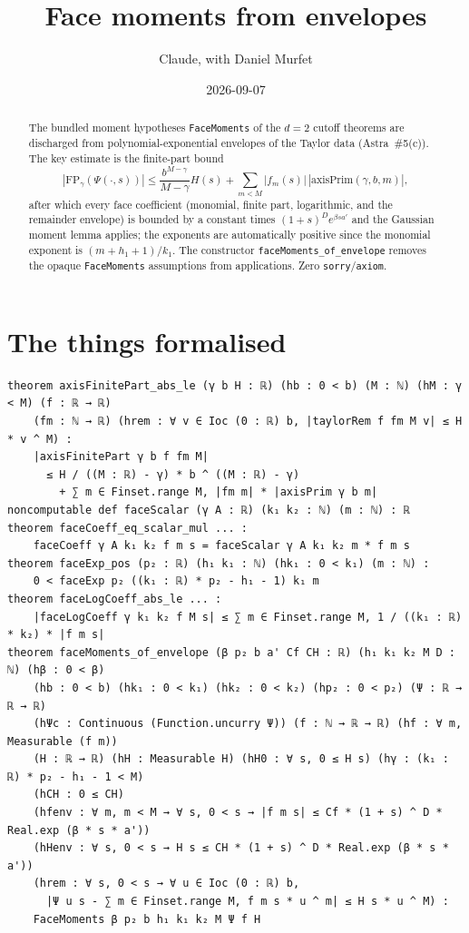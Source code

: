 \documentclass[11pt]{article}
\title{Face moments from envelopes}
\author{Claude, with Daniel Murfet}
\date{2026-09-07}
\begin{document}
\maketitle
\sloppy

\begin{abstract}
The bundled moment hypotheses \texttt{FaceMoments} of the $d=2$ cutoff theorems are discharged from
polynomial-exponential envelopes of the Taylor data (Astra~\#5(c)). The key estimate is the finite-part
bound
\[
|\mathrm{FP}_\gamma(\Psi(\cdot,s))|\le\frac{b^{M-\gamma}}{M-\gamma}H(s)+\sum_{m<M}|f_m(s)|\,|\mathrm{axisPrim}(\gamma,b,m)|,
\]
after which every face coefficient (monomial, finite part, logarithmic, and the remainder envelope)
is bounded by a constant times $(1+s)^De^{\beta sa'}$ and the Gaussian moment lemma applies; the
exponents are automatically positive since the monomial exponent is $(m+h_1+1)/k_1$. The constructor
\texttt{faceMoments\_of\_envelope} removes the opaque \texttt{FaceMoments} assumptions from
applications. Zero \texttt{sorry}/\texttt{axiom}.
\end{abstract}

\section{The things formalised}
{\small
\begin{verbatim}
theorem axisFinitePart_abs_le (γ b H : ℝ) (hb : 0 < b) (M : ℕ) (hM : γ < M) (f : ℝ → ℝ)
    (fm : ℕ → ℝ) (hrem : ∀ v ∈ Ioc (0 : ℝ) b, |taylorRem f fm M v| ≤ H * v ^ M) :
    |axisFinitePart γ b f fm M|
      ≤ H / ((M : ℝ) - γ) * b ^ ((M : ℝ) - γ)
        + ∑ m ∈ Finset.range M, |fm m| * |axisPrim γ b m|
noncomputable def faceScalar (γ A : ℝ) (k₁ k₂ : ℕ) (m : ℕ) : ℝ
theorem faceCoeff_eq_scalar_mul ... :
    faceCoeff γ A k₁ k₂ f m s = faceScalar γ A k₁ k₂ m * f m s
theorem faceExp_pos (p₂ : ℝ) (h₁ k₁ : ℕ) (hk₁ : 0 < k₁) (m : ℕ) :
    0 < faceExp p₂ ((k₁ : ℝ) * p₂ - h₁ - 1) k₁ m
theorem faceLogCoeff_abs_le ... :
    |faceLogCoeff γ k₁ k₂ f M s| ≤ ∑ m ∈ Finset.range M, 1 / ((k₁ : ℝ) * k₂) * |f m s|
theorem faceMoments_of_envelope (β p₂ b a' Cf CH : ℝ) (h₁ k₁ k₂ M D : ℕ) (hβ : 0 < β)
    (hb : 0 < b) (hk₁ : 0 < k₁) (hk₂ : 0 < k₂) (hp₂ : 0 < p₂) (Ψ : ℝ → ℝ → ℝ)
    (hΨc : Continuous (Function.uncurry Ψ)) (f : ℕ → ℝ → ℝ) (hf : ∀ m, Measurable (f m))
    (H : ℝ → ℝ) (hH : Measurable H) (hH0 : ∀ s, 0 ≤ H s) (hγ : (k₁ : ℝ) * p₂ - h₁ - 1 < M)
    (hCH : 0 ≤ CH)
    (hfenv : ∀ m, m < M → ∀ s, 0 < s → |f m s| ≤ Cf * (1 + s) ^ D * Real.exp (β * s * a'))
    (hHenv : ∀ s, 0 < s → H s ≤ CH * (1 + s) ^ D * Real.exp (β * s * a'))
    (hrem : ∀ s, 0 < s → ∀ u ∈ Ioc (0 : ℝ) b,
      |Ψ u s - ∑ m ∈ Finset.range M, f m s * u ^ m| ≤ H s * u ^ M) :
    FaceMoments β p₂ b h₁ k₁ k₂ M Ψ f H
\end{verbatim}
}
\end{document}
